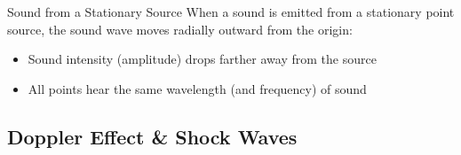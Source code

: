 \documentclass[12pt,aspectratio=169]{beamer}
\begin{document}
\begin{frame}{Sound from a Stationary Source}
  When a sound is emitted from a stationary point source, the sound wave moves
  radially outward from the origin:
  \begin{center}
    \begin{itemize}
    \item Sound intensity (amplitude) drops farther away from the source
    \item All points hear the same wavelength (and frequency) of sound
    \end{itemize}
  \end{center}
\end{frame}



\subsection{Doppler Effect \& Shock Waves}
\end{document}
